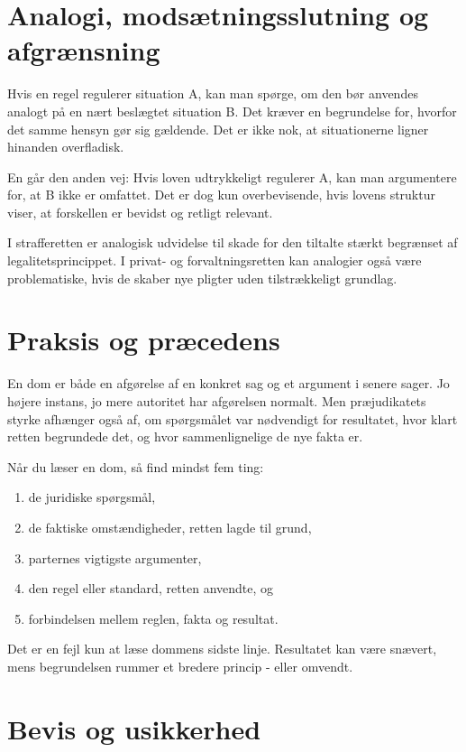 \section{Analogi, modsætningsslutning og afgrænsning}

Hvis en regel regulerer situation A, kan man spørge, om den bør anvendes analogt på en nært beslægtet situation B. Det kræver en begrundelse for, hvorfor det samme hensyn gør sig gældende. Det er ikke nok, at situationerne ligner hinanden overfladisk.

En  går den anden vej: Hvis loven udtrykkeligt regulerer A, kan man argumentere for, at B ikke er omfattet. Det er dog kun overbevisende, hvis lovens struktur viser, at forskellen er bevidst og retligt relevant.

I strafferetten er analogisk udvidelse til skade for den tiltalte stærkt begrænset af legalitetsprincippet. I privat- og forvaltningsretten kan analogier også være problematiske, hvis de skaber nye pligter uden tilstrækkeligt grundlag.

\section{Praksis og præcedens}

En dom er både en afgørelse af en konkret sag og et argument i senere sager. Jo højere instans, jo mere autoritet har afgørelsen normalt. Men præjudikatets styrke afhænger også af, om spørgsmålet var nødvendigt for resultatet, hvor klart retten begrundede det, og hvor sammenlignelige de nye fakta er.

Når du læser en dom, så find mindst fem ting:
\begin{enumerate}
  \item de juridiske spørgsmål,
  \item de faktiske omstændigheder, retten lagde til grund,
  \item parternes vigtigste argumenter,
  \item den regel eller standard, retten anvendte, og
  \item forbindelsen mellem reglen, fakta og resultat.
\end{enumerate}

Det er en fejl kun at læse dommens sidste linje. Resultatet kan være snævert, mens begrundelsen rummer et bredere princip - eller omvendt.

\section{Bevis og usikkerhed}

